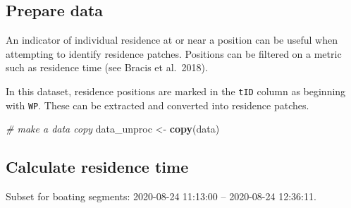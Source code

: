 \documentclass[
]{scrreprt}
\newenvironment{Shaded}{}{}
\newcommand{\CommentTok}[1]{\textcolor[rgb]{0.38,0.63,0.69}{\textit{#1}}}
\newcommand{\DataTypeTok}[1]{\textcolor[rgb]{0.56,0.13,0.00}{#1}}
\newcommand{\DecValTok}[1]{\textcolor[rgb]{0.25,0.63,0.44}{#1}}
\newcommand{\ErrorTok}[1]{\textcolor[rgb]{1.00,0.00,0.00}{\textbf{#1}}}
\newcommand{\KeywordTok}[1]{\textcolor[rgb]{0.00,0.44,0.13}{\textbf{#1}}}
\newcommand{\NormalTok}[1]{#1}
\newcommand{\OperatorTok}[1]{\textcolor[rgb]{0.40,0.40,0.40}{#1}}
\newcommand{\StringTok}[1]{\textcolor[rgb]{0.25,0.44,0.63}{#1}}
\begin{document}
\hypertarget{prepare-data}{%
\subsection{Prepare data}\label{prepare-data}}

An indicator of individual residence at or near a position can be useful when attempting to identify residence patches. Positions can be filtered on a metric such as residence time (see Bracis et al.~2018).

In this dataset, residence positions are marked in the \texttt{tID} column as beginning with \texttt{WP}. These can be extracted and converted into residence patches.

\begin{Shaded}
\begin{Highlighting}[]
\CommentTok{\# make a data copy}
\NormalTok{data\_unproc <{-}}\StringTok{ }\KeywordTok{copy}\NormalTok{(data)}
\end{Highlighting}
\end{Shaded}

\hypertarget{calculate-residence-time}{%
\subsection{Calculate residence time}\label{calculate-residence-time}}

Subset for boating segments: 2020-08-24 11:13:00 -- 2020-08-24 12:36:11.

\begin{Shaded}
\end{Shaded}
\end{document}
